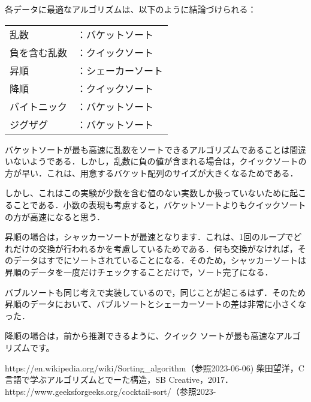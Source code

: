 \documentclass[a4j, titlepage]{jarticle}
\begin{document}
    \vspace{90pt}
    
    各データに最適なアルゴリズムは、以下のように結論づけられる：
    \begin{shadebox}
        \begin{tabular}{ll}
            乱数 &：バケットソート\\
            負を含む乱数 &：クイックソート\\
            昇順 &：シェーカーソート\\
            降順 &：クイックソート\\
            バイトニック &：バケットソート\\
            ジグザグ &：バケットソート\\
        \end{tabular}
    \end{shadebox}
    
    

    バケットソートが最も高速に乱数をソートできるアルゴリズムであることは間違いないようである．しかし，乱数に負の値が含まれる場合は，クイックソートの方が早い．これは、用意するバケット配列のサイズが大きくなるためである．
    
    しかし、これはこの実験が少数を含む値のない実数しか扱っていないために起こることである．小数の表現も考慮すると，バケットソートよりもクイックソートの方が高速になると思う．
    
    昇順の場合は，シャッカーソートが最速となります．これは、1回のループでどれだけの交換が行われるかを考慮しているためである．何も交換がなければ，そのデータはすでにソートされていることになる．そのため，シャッカーソートは昇順のデータを一度だけチェックすることだけで，ソート完了になる．
    
    バブルソートも同じ考えで実装しているので，同じことが起こるはず．そのため昇順のデータにおいて、バブルソートとシェーカーソートの差は非常に小さくなった．
    
    降順の場合は，前から推測できるように、クイック ソートが最も高速なアルゴリズムです。

    \begin{thebibliography}
        
        https://en.wikipedia.org/wiki/Sorting_algorithm（参照2023-06-06)
        柴田望洋，C言語で学ぶアルゴリズムとでーた構造，SB Creative，2017．
        https://www.geeksforgeeks.org/cocktail-sort/（参照2023-
    \end{thebibliography}
\end{document}
